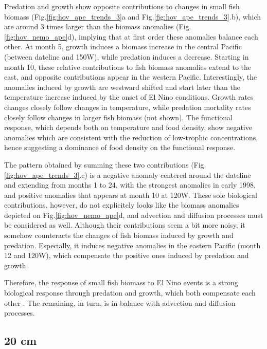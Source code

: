 Predation and growth show opposite contributions to changes in small fish biomass (Fig.\ref{fig:hov_ape_trends_3}a and Fig.\ref{fig:hov_ape_trends_3}.b), which are around 3 times larger than the biomass anomalies (Fig. \ref{fig:hov_nemo_ape}d), implying that at first order these anomalies balance each other. At month 5, growth induces a biomass increase in the central Pacific (between dateline and 150\degree{}W), while predation induces a decrease. Starting in month 10, these relative contributions to fish biomass anomalies extend to the east, and opposite contributions appear in the western Pacific. Interestingly, the anomalies induced by growth are westward shifted and start later than the temperature increase induced by the onset of El Nino conditions. Growth rates changes closely follow changes in temperature, while predation mortality rates closely follow changes in larger fish biomass (not shown). The functional response, which depends both on temperature and food density, show negative anomalies which are consistent with the reduction of low-trophic concentrations, hence suggesting a dominance of food density on the functional response.

The pattern obtained by summing these two contributions (Fig.\ref{fig:hov_ape_trends_3}.c) is a negative anomaly centered around the dateline and extending from months 1 to 24, with the strongest anomalies in early 1998, and positive anomalies that appears at month 10 at 120\degree{}W. These sole biological contributions, however, do not explicitely looks like the biomass anomalies depicted on Fig.\ref{fig:hov_nemo_ape}d, and advection and diffusion processes must be considered as well. Although their contributions seem a bit more noisy, it somehow counteracts the changes of fish biomass induced by growth and predation. Especially, it induces negative anomalies in the eastern Pacific (month 12 and 120\degree{}W), which compensate the positive ones induced by predation and growth. 

Therefore, the response of small fish biomass to El Nino events is a strong biological response through predation and growth, which both compensate each other . The remaining, in turn, is in balance with advection and diffusion processes.

\subsection{20 cm}

